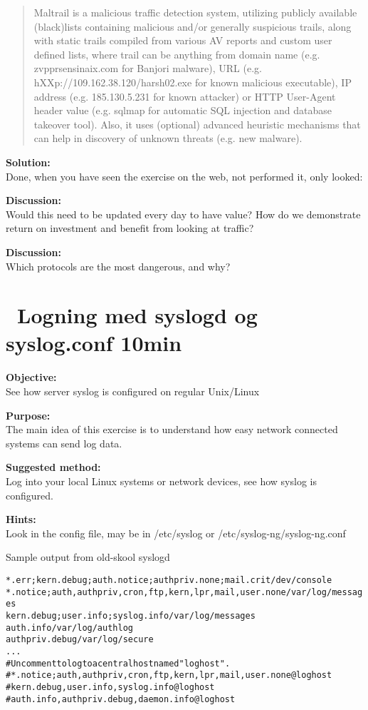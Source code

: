 \documentclass[a4paper,11pt,notitlepage]{report}
\begin{document}
\begin{quote}
  Maltrail is a malicious traffic detection system, utilizing publicly available (black)lists containing malicious and/or generally suspicious trails, along with static trails compiled from various AV reports and custom user defined lists, where trail can be anything from domain name (e.g. zvpprsensinaix.com for Banjori malware), URL (e.g. hXXp://109.162.38.120/harsh02.exe for known malicious executable), IP address (e.g. 185.130.5.231 for known attacker) or HTTP User-Agent header value (e.g. sqlmap for automatic SQL injection and database takeover tool). Also, it uses (optional) advanced heuristic mechanisms that can help in discovery of unknown threats (e.g. new malware).
\end{quote}


{\bf Solution:}\\
Done, when you have seen the exercise on the web, not performed it, only looked:

{\bf Discussion:}\\
Would this need to be updated every day to have value? How do we demonstrate return on investment and benefit from looking at traffic?



{\bf Discussion:}\\
Which protocols are the most dangerous, and why?


\chapter{\faInfoCircle\ Logning med syslogd og syslog.conf 10min}
\label{ex:syslogd-basic}

{\bf Objective:} \\
See how server syslog is configured on regular Unix/Linux

{\bf Purpose:}\\
The main idea of this exercise is to understand how easy network connected systems can send log data.


{\bf Suggested method:}\\
Log into your local Linux systems or network devices, see how syslog is configured.

{\bf Hints:}\\
Look in the config file, may be in /etc/syslog  or /etc/syslog-ng/syslog-ng.conf

Sample output from old-skool syslogd
\begin{alltt}
\small
*.err;kern.debug;auth.notice;authpriv.none;mail.crit    /dev/console
*.notice;auth,authpriv,cron,ftp,kern,lpr,mail,user.none /var/log/messages
kern.debug;user.info;syslog.info                        /var/log/messages
auth.info                                               /var/log/authlog
authpriv.debug                                          /var/log/secure
...
# Uncomment to log to a central host named "loghost".
#*.notice;auth,authpriv,cron,ftp,kern,lpr,mail,user.none        @loghost
#kern.debug,user.info,syslog.info                               @loghost
#auth.info,authpriv.debug,daemon.info                           @loghost
\end{alltt}
\end{document}
